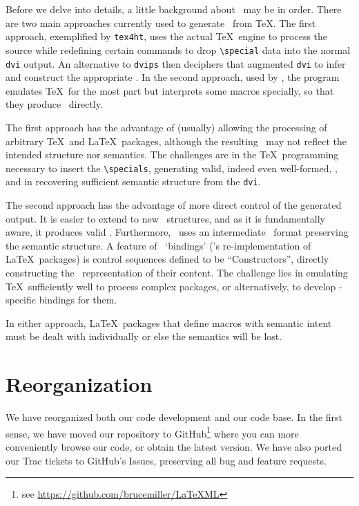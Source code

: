 \documentclass{llncs}
\begin{document}
Before we delve into details, a little background about \LaTeXML\ may be in order.
There are two main approaches currently used to generate
\HTML\ from \TeX. The first approach,
exemplified by \texttt{tex4ht}, uses the actual \TeX\ engine
to process the source while redefining certain commands to drop
\verb|\special| data into the normal \texttt{dvi} output.
An alternative to \texttt{dvips} then deciphers that augmented \texttt{dvi}
to infer and construct the appropriate \HTML.
In the second approach, used by \LaTeXML, the program
emulates \TeX\ for the most part but interprets some macros
specially, so that they produce \XML\ directly.

The first approach has the advantage of (usually)
allowing the processing of arbitrary \TeX\ and \LaTeX\ packages,
although the resulting \HTML\ may not reflect the intended
structure nor semantics.
The challenges are in the \TeX\ programming necessary to
insert the \verb|\specials|, generating valid, indeed even well-formed, \HTML,
and in recovering sufficient semantic structure from the \texttt{dvi}.

The second approach has the advantage of more
direct control of the generated output.
It is easier to extend to new \XML\ structures,
and as it is fundamentally {\XML} aware, it produces valid \XML.
Furthermore, \LaTeXML\ uses an intermediate \XML\ format preserving
the semantic structure. 
A feature of \LaTeXML\ `bindings' (\LaTeXML's re-implementation
of \LaTeX\ packages) is control sequences defined to be ``Constructors'',
directly constructing the \XML\ representation of their content.
The challenge lies in emulating \TeX\ sufficiently well to
process complex packages, or alternatively, to
develop \LaTeXML-specific bindings for them.

In either approach, \LaTeX\ packages that define
macros with semantic intent must be dealt with
individually or else the semantics will be lost.

\section{Reorganization}\label{reorganization}
We have reorganized both our code development and our code base.
In the first sense, we have moved our repository to GitHub\footnote{see \url{https://github.com/brucemiller/LaTeXML}} 
where you can more conveniently browse our code, or obtain the latest version.
We have also ported our Trac tickets to GitHub's Issues,
preserving all bug and feature requests.
\end{document}
